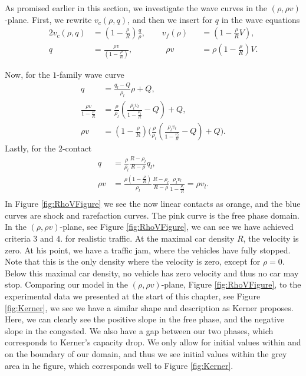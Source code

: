 \documentclass[10pt]{article}
\numberwithin{equation}{section}
\begin{document}
As promised earlier in this section, we investigate the wave curves in the $(\rho, \rho v)$-plane. First, we rewrite $v_c(\rho,q)$, and then we insert for $q$ in the wave equations
\begin{alignat*}{2}
    v_c(\rho,q) &= ( 1 - \frac{\rho}{R})\frac{q}{\rho},  \quad \quad v_f(\rho) &&= (1- \frac{\rho}{R}V),  \\
    q &= \frac{\rho v }{( 1 - \frac{\rho}{R})}, \quad \quad \quad\quad \rho v &&= \rho(1- \frac{\rho}{R})V .
\end{alignat*}

Now, for the $1$-family wave curve
\begin{align*}
    q &= \frac{q_l-Q}{\rho_l}\rho + Q, \\
    \frac{\rho v}{1- \frac{\rho}{R}} &= \frac{\rho}{\rho_l}( \frac{\rho_l v_l}{1- \frac{\rho_l}{R} } -Q )  + Q , \\
    \rho v &= (1 - \frac{\rho}{R}) \bigg( \frac{\rho}{\rho_l}( \frac{\rho_l v_l}{1- \frac{\rho_l}{R}} - Q) + Q \bigg). 
\end{align*}
Lastly, for the $2$-contact
\begin{align*}
    q &= \frac{\rho}{\rho_l} \frac{R - \rho_l}{R - \rho} q_l, \\ 
    \rho v &= \frac{\rho (1 - \frac{\rho}{R}) }{\rho_l} \frac{R - \rho_l}{R - \rho} \frac{\rho_l v_l}{1 - \frac{\rho_l}{R}}  = \rho v_l . \\ 
\end{align*}
In Figure \ref{fig:RhoVFigure} we see the now linear contacts as orange, and the blue curves are shock and rarefaction curves. The pink curve is the free phase domain. 
In the $(\rho , \rho v)$-plane, see Figure \ref{fig:RhoVFigure}, we can see we have achieved criteria $3$ and $4.$ for realistic traffic. At the maximal car density $R$, the velocity is zero. At his point, we have a traffic jam, where the vehicles have fully stopped. Note that this is the only density where the velocity is zero, except for $ \rho = 0$. Below this maximal car density, no vehicle has zero velocity and thus no car may stop.  
Comparing our model in the $(\rho, \rho v)$-plane, Figure \ref{fig:RhoVFigure}, to the experimental data we presented at the start of this chapter, see Figure \ref{fig:Kerner}, we see we have a similar shape and description as Kerner proposes. Here, we can clearly see the positive slope in the free phase, and the negative slope in the congested. We also have a gap between our two phases, which corresponds to Kerner's capacity drop. We only allow for initial values within and on the boundary of our domain, and thus we see initial values within the grey area in he figure, which corresponds well to Figure \ref{fig:Kerner}. 
\end{document}
